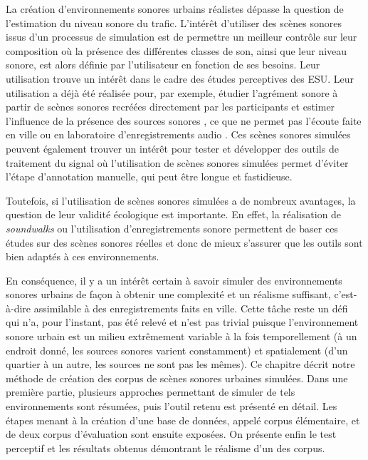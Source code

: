 La création d'environnements sonores urbains réalistes dépasse la question de l'estimation du niveau sonore du trafic. L'intérêt d'utiliser des scènes sonores issus d'un processus de simulation est de permettre un meilleur contrôle sur leur composition où la présence des différentes classes de son, ainsi que leur niveau sonore, est alors définie par l'utilisateur en fonction de ses besoins.
Leur utilisation trouve un intérêt dans le cadre des études perceptives des ESU. Leur utilisation a déjà été réalisée pour, par exemple, étudier l'agrément sonore à partir de scènes sonores recréées directement par les participants et estimer l'influence de la présence des sources sonores \cite{lafay_new_2014}, ce que ne permet pas l'écoute faite en ville \cite{adams_soundwalking_2008, liu2014effects} ou en laboratoire d'enregistrements audio \cite{guastavino2005ecological, cain2013development}.
Ces scènes sonores simulées peuvent également trouver un intérêt pour tester et développer des outils de traitement du signal \cite{Komatsu2016, geiger2015improving} où l'utilisation de scènes sonores simulées permet d'éviter l'étape d'annotation manuelle, qui peut être longue et fastidieuse.

Toutefois, si l'utilisation de scènes sonores simulées a de nombreux avantages, la question de leur validité écologique est importante. En effet, la réalisation de \textit{soundwalks} ou l'utilisation d'enregistrements sonore permettent de baser ces études sur des scènes sonores réelles et donc de mieux s'assurer que les outils sont bien adaptés à ces environnements.

En conséquence, il y a un intérêt certain à savoir simuler des environnements sonores urbains de façon à obtenir une complexité et un réalisme suffisant, c'est-à-dire assimilable à des enregistrements faits en ville. Cette tâche reste un défi qui n'a, pour l'instant, pas été relevé et n'est pas trivial puisque l'environnement sonore urbain est un milieu extrêmement variable à la fois temporellement (à un endroit donné, les sources sonores varient constamment) et spatialement (d'un quartier à un autre, les sources ne sont pas les mêmes).
Ce chapitre décrit notre méthode de création des corpus de scènes sonores urbaines simulées. Dans une première partie, plusieurs approches permettant de simuler de tels environnements sont résumées, puis l'outil retenu est présenté en détail. Les étapes menant à la création d'une base de données, appelé corpus élémentaire, et de deux corpus d'évaluation sont ensuite exposées. On présente enfin le test perceptif et les résultats obtenus démontrant le réalisme d'un des corpus.

